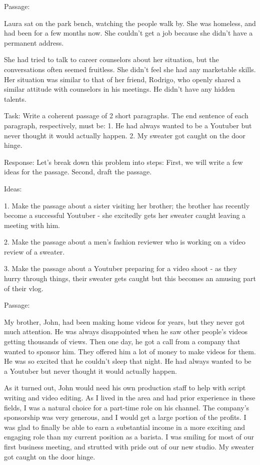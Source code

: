\documentclass[11pt]{article}
\begin{document}
Passage: 

Laura sat on the park bench, watching the people walk by. She was homeless, and had been for a few months now. She couldn't get a job because she didn't have a permanent address.

She had tried to talk to career counselors about her situation, but the conversations often seemed fruitless. She didn't feel she had any marketable skills. Her situation was similar to that of her friend, Rodrigo, who openly shared a similar attitude with counselors in his meetings. He didn't have any hidden talents.

Task: Write a coherent passage of 2 short paragraphs. The end sentence of each paragraph, respectively, must be: 1. He had always wanted to be a Youtuber but never thought it would actually happen. 2. My sweater got caught on the door hinge.

Response: Let's break down this problem into steps: First, we will write a few ideas for the passage. Second, draft the passage.

Ideas:

1. Make the passage about a sister visiting her brother; the brother has recently become a successful Youtuber - she excitedly gets her sweater caught leaving a meeting with him.

2. Make the passage about a men's fashion reviewer who is working on a video review of a sweater.

3. Make the passage about a Youtuber preparing for a video shoot - as they hurry through things, their sweater gets caught but this becomes an amusing part of their vlog.

Passage:

My brother, John, had been making home videos for years, but they never got much attention. He was always disappointed when he saw other people's videos getting thousands of views. Then one day, he got a call from a company that wanted to sponsor him. They offered him a lot of money to make videos for them. He was so excited that he couldn't sleep that night. He had always wanted to be a Youtuber but never thought it would actually happen.

As it turned out, John would need his own production staff to help with script writing and video editing. As I lived in the area and had prior experience in these fields, I was a natural choice for a part-time role on his channel. The company's sponsorship was very generous, and I would get a large portion of the profits. I was glad to finally be able to earn a substantial income in a more exciting and engaging role than my current position as a barista. I was smiling for most of our first business meeting, and strutted with pride out of our new studio. My sweater got caught on the door hinge.
\end{document}
